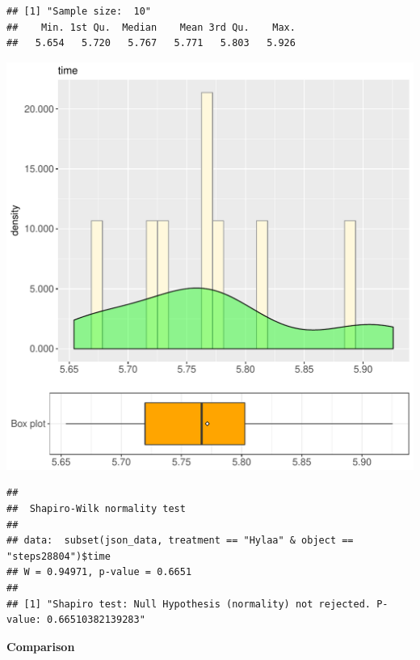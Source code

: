 \documentclass{article}\usepackage[]{graphicx}\usepackage[]{color}
\makeatletter
\def\maxwidth{ %
  \ifdim\Gin@nat@width>\linewidth
    \linewidth
  \else
    \Gin@nat@width
  \fi
}
\newenvironment{kframe}{%
 \def\at@end@of@kframe{}%
 \ifinner\ifhmode%
  \def\at@end@of@kframe{\end{minipage}}%
  \begin{minipage}{\columnwidth}%
 \fi\fi%
 \def\FrameCommand##1{\hskip\@totalleftmargin \hskip-\fboxsep
 \colorbox{shadecolor}{##1}\hskip-\fboxsep
     \hskip-\linewidth \hskip-\@totalleftmargin \hskip\columnwidth}%
 \MakeFramed {\advance\hsize-\width
   \@totalleftmargin\z@ \linewidth\hsize
   \@setminipage}}%
 {\par\unskip\endMakeFramed%
 \at@end@of@kframe}
\newenvironment{knitrout}{}{} %
\makeatother
\begin{document}
\begin{knitrout}
\color{fgcolor}\begin{kframe}
\begin{verbatim}
## [1] "Sample size:  10"
##    Min. 1st Qu.  Median    Mean 3rd Qu.    Max. 
##   5.654   5.720   5.767   5.771   5.803   5.926
\end{verbatim}
\end{kframe}
\includegraphics[width=\maxwidth]{figure/RH2_Hylaa_steps28804-1} 
\begin{kframe}\begin{verbatim}
## 
## 	Shapiro-Wilk normality test
## 
## data:  subset(json_data, treatment == "Hylaa" & object == "steps28804")$time
## W = 0.94971, p-value = 0.6651
## 
## [1] "Shapiro test: Null Hypothesis (normality) not rejected. P-value: 0.66510382139283"
\end{verbatim}
\end{kframe}
\end{knitrout}
  
 \textbf{Comparison}
  
\end{document}
